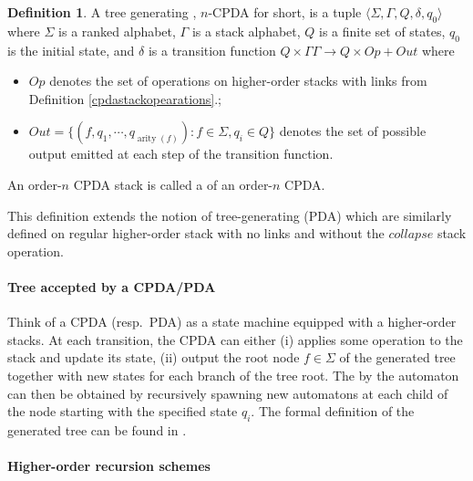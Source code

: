 \documentclass[a4paper]{article}[12pt]
\theoremstyle{remark}
\theoremstyle{definition}
\newtheorem{definition}{Definition}[section]
\newcommand\arity{\mathop{\mathrm{arity}}}
\begin{document}
\begin{definition}
	A tree generating , $n$-CPDA for short, is a tuple $\langle \Sigma, \Gamma,Q,\delta,q_0 \rangle$ where $\Sigma$ is a ranked alphabet,
	$\Gamma$ is a stack alphabet, $Q$ is a finite set of states, $q_0$
	is the initial state, and $\delta$ is a transition function $ Q \times \Gamma Γ \longrightarrow Q \times Op + Out$ where
	\begin{itemize}
		\item  $Op$ denotes the set of operations on higher-order stacks with links from Definition \ref{cpdastackopearations}.;
		\item $Out = \{(f, q_1 , \cdots ,q_{\arity(f)})  : f \in \Sigma, q_ i \in Q \}$ denotes the set of possible output emitted at each step of the transition function.
	\end{itemize}
	An order-$n$ CPDA stack is called a  of an order-$n$ CPDA.
\end{definition}

This definition extends the notion of tree-generating  (PDA) which are similarly defined on regular higher-order stack with no links and without the $collapse$ stack operation.

\paragraph{Tree accepted by a CPDA/PDA}

Think of a CPDA (resp.\ PDA) as a state machine equipped with a higher-order stacks. At each transition, the CPDA can either (i) applies some operation to the stack and update its state, (ii) output the root node $f\in \Sigma$ of the generated tree together with new states for each branch of the tree root. The  by the automaton can then be obtained by recursively spawning new automatons at each child of the node starting with the specified state $q_i$.
The formal definition of the generated tree can be found in \cite{KNU02,hague-collaps-full}.


\paragraph{Higher-order recursion schemes} \hfill
\end{document}
